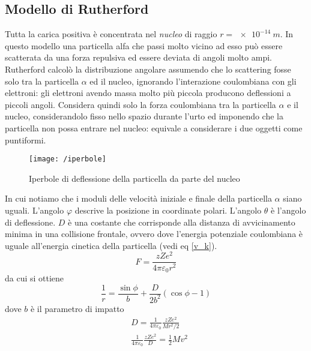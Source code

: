 \subsection{Modello di Rutherford}
Tutta la carica positiva è concentrata nel \textit{nucleo} di raggio $r = \SI{e-14}{m}$.
In questo modello una particella alfa che passi molto vicino ad esso può essere scatterata da una forza repulsiva ed essere deviata di angoli molto ampi.
Rutherford calcolò la distribuzione angolare assumendo che lo scattering fosse solo tra la particella $\alpha$ ed il nucleo, ignorando l'interazione coulombiana con gli elettroni: gli elettroni avendo massa molto più piccola producono deflessioni a piccoli angoli.
Considera quindi solo la forza coulombiana tra la particella $\alpha$ e il nucleo, considerandolo fisso nello spazio durante l'urto ed imponendo che la particella non possa entrare nel nucleo: equivale a considerare i due oggetti come puntiformi.
\begin{figure}[h]
\centering
\texttt{[image: /iperbole]}
\caption{Iperbole di deflessione della particella da parte del nucleo}
\end{figure}
In cui notiamo che i moduli delle velocità iniziale e finale della particella $\alpha$ siano uguali.
L'angolo $\varphi$ descrive la posizione in coordinate polari.
L'angolo $\theta$ è l'angolo di deflessione.
$D$ è una costante che corrisponde alla distanza di avvicinamento minima in una collisione frontale, ovvero dove l'energia potenziale coulombiana è uguale all'energia cinetica della particella (vedi eq \ref{v_k}).
\begin{equation}
F = \frac{z Z e^2}{4\pi \varepsilon_0 r^2}
\end{equation}
da cui si ottiene
\begin{equation}
\frac{1}{r} = \frac{\sin \phi}{b} + \frac{D}{2 b^2} ( \cos \phi - 1 )
\end{equation}
dove $b$ è il parametro di impatto
\begin{equation}
\begin{split}
& D = \frac{1}{4\pi \varepsilon_0} \frac{z Z e^2}{M r^2/2} \\
& \frac{1}{4\pi \varepsilon_0} \frac{z Z e^2}{D} = \frac{ 1}{2 } M v^2
\end{split}
\label{v_k}
\end{equation}


